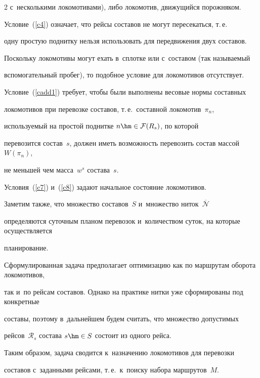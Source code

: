 \begin{multicols}{2}
 с~несколькими локомотивами), либо локомотив, движущийся порожняком.





Условие~(\ref{c4}) означает, что рейсы составов не могут пересекаться, т.\,е.\


 одну простую поднитку нельзя использовать для передвижения двух составов. 


 Поскольку локомотивы могут ехать в~сплотке или с~составом (так называемый 


 вспомогательный пробег), то подобное условие для локомотивов отсутствует.





Условие~(\ref{cadd1}) требует, чтобы были выполнены весовые нормы составных 


локомотивов при перевозке составов, т.\,е.\ составной локомотив~$\pi_n$, 


используемый на простой поднитке $n \hm\in \mathcal F(R_s)$, по которой 


перевозится состав~$s$, должен иметь возможность перевозить состав массой~$W(\pi_n)$, 


не меньшей чем масса~$w^s$ состава~$s$.





Условия~(\ref{c7}) и~(\ref{c8}) задают начальное состояние локомотивов.





Заметим также, что множество составов~$S$ и~множество ниток~$\overline{\mathcal N}$ 


определяются суточным планом перевозок и~количеством суток, на которые осуществляется 


планирование.





Сформулированная задача предполагает оптимизацию как по маршрутам оборота локомотивов, 


так и~по рейсам составов. Однако на практике нитки уже сформированы под конкретные 


составы, поэтому в~дальнейшем будем считать, что множество допустимых 


рейсов~$\mathcal R_s$ состава $s\hm\in S$ состоит из одного рейса. 


Таким образом, задача сводится к~назначению локомотивов для перевозки 


составов с~заданными рейсами, т.\,е.\ к~поиску набора маршрутов~$M$.









\end{multicols}
